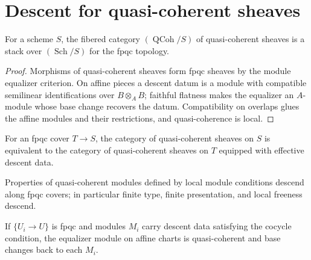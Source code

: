 \section{Descent for quasi-coherent sheaves}

\begin{theorem}\label{fga-thm-4-23}
For a scheme $S$, the fibered category $(\operatorname{QCoh}/S)$ of
quasi-coherent sheaves is a stack over $(\operatorname{Sch}/S)$ for the fpqc
topology.
\end{theorem}
\begin{proof}
Morphisms of quasi-coherent sheaves form fpqc sheaves by the module equalizer
criterion.  On affine pieces a descent datum is a module with compatible
semilinear identifications over $B\otimes_A B$; faithful flatness makes the
equalizer an $A$-module whose base change recovers the datum.  Compatibility on
overlaps glues the affine modules and their restrictions, and quasi-coherence
is local.
\end{proof}
\begin{theorem}\label{fga-thm-4-21}
For an fpqc cover $T\to S$, the category of quasi-coherent sheaves on $S$ is
equivalent to the category of quasi-coherent sheaves on $T$ equipped with
effective descent data.
\end{theorem}
\begin{corollary}\label{fga-cor-4-34}
Properties of quasi-coherent modules defined by local module conditions descend
along fpqc covers; in particular finite type, finite presentation, and local
freeness descend.
\end{corollary}
\begin{lemma}\label{fga-lem-4-30}
If $\{U_i\to U\}$ is fpqc and modules $M_i$ carry descent data satisfying the
cocycle condition, the equalizer module on affine charts is quasi-coherent and
base changes back to each $M_i$.
\end{lemma}


